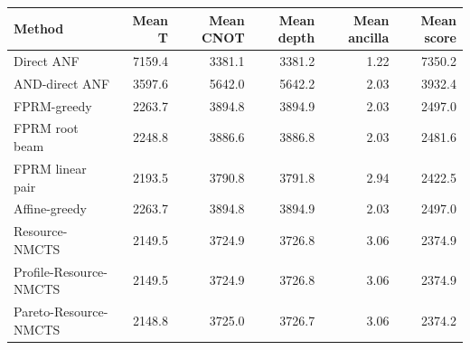 \begin{tabular}{lrrrrr}
\toprule
Method & Mean T & Mean CNOT & Mean depth & Mean ancilla & Mean score \\
\midrule
Direct ANF & 7159.4 & 3381.1 & 3381.2 & 1.22 & 7350.2 \\
AND-direct ANF & 3597.6 & 5642.0 & 5642.2 & 2.03 & 3932.4 \\
FPRM-greedy & 2263.7 & 3894.8 & 3894.9 & 2.03 & 2497.0 \\
FPRM root beam & 2248.8 & 3886.6 & 3886.8 & 2.03 & 2481.6 \\
FPRM linear pair & 2193.5 & 3790.8 & 3791.8 & 2.94 & 2422.5 \\
Affine-greedy & 2263.7 & 3894.8 & 3894.9 & 2.03 & 2497.0 \\
Resource-NMCTS & 2149.5 & 3724.9 & 3726.8 & 3.06 & 2374.9 \\
Profile-Resource-NMCTS & 2149.5 & 3724.9 & 3726.8 & 3.06 & 2374.9 \\
Pareto-Resource-NMCTS & 2148.8 & 3725.0 & 3726.7 & 3.06 & 2374.2 \\
\bottomrule
\end{tabular}
